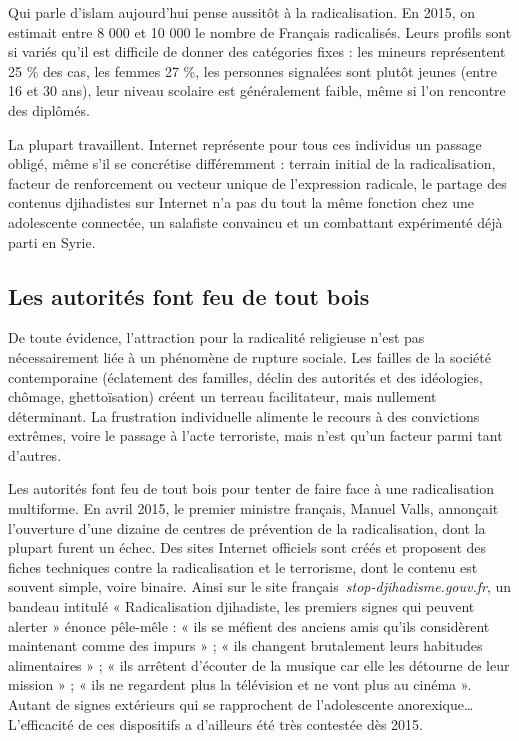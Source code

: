 Qui parle d'islam aujourd'hui pense aussitôt à la radicalisation. En
2015, on estimait entre 8 000 et 10 000 le nombre de Français
radicalisés. Leurs profils sont si variés qu'il est difficile de donner
des catégories fixes : les mineurs représentent 25 \% des cas, les
femmes 27 \%, les personnes signalées sont plutôt jeunes (entre 16 et 30
ans), leur niveau scolaire est généralement faible, même si l'on
rencontre des diplômés.

La plupart travaillent. Internet représente pour tous ces individus un
passage obligé, même s'il se concrétise différemment : terrain initial
de la radicalisation, facteur de renforcement ou vecteur unique de
l'expression radicale, le partage des contenus djihadistes sur Internet
n'a pas du tout la même fonction chez une adolescente connectée, un
salafiste convaincu et un combattant expérimenté déjà parti en Syrie.

\subsection{Les autorités font feu de tout bois}

De toute évidence, l'attraction pour la radicalité religieuse n'est pas
nécessairement liée à un phénomène de rupture sociale. Les failles de la
société contemporaine (éclatement des familles, déclin des autorités et
des idéologies, chômage, ghettoïsation) créent un terreau facilitateur,
mais nullement déterminant. La frustration individuelle alimente le
recours à des convictions extrêmes, voire le passage à l'acte
terroriste, mais n'est qu'un facteur parmi tant d'autres.

Les autorités font feu de tout bois pour tenter de faire face à une
radicalisation multiforme. En avril 2015, le premier ministre français,
Manuel Valls, annonçait l'ouverture d'une dizaine de centres de
prévention de la radicalisation, dont la plupart furent un échec. Des
sites Internet officiels sont créés et proposent des fiches techniques
contre la radicalisation et le terrorisme, dont le contenu est souvent
simple, voire binaire. Ainsi sur le site
français~\emph{stop-djihadisme.gouv.fr}, un bandeau intitulé «
Radicalisation djihadiste, les premiers signes qui peuvent alerter »
énonce pêle-mêle : « ils se méfient des anciens amis qu'ils considèrent
maintenant comme des impurs » ; « ils changent brutalement leurs
habitudes alimentaires » ; « ils arrêtent d'écouter de la musique car
elle les détourne de leur mission » ; « ils ne regardent plus la
télévision et ne vont plus au cinéma ». Autant de signes extérieurs qui
se rapprochent de l'adolescente anorexique\ldots{} L'efficacité de ces
dispositifs a d'ailleurs été très contestée dès 2015.

